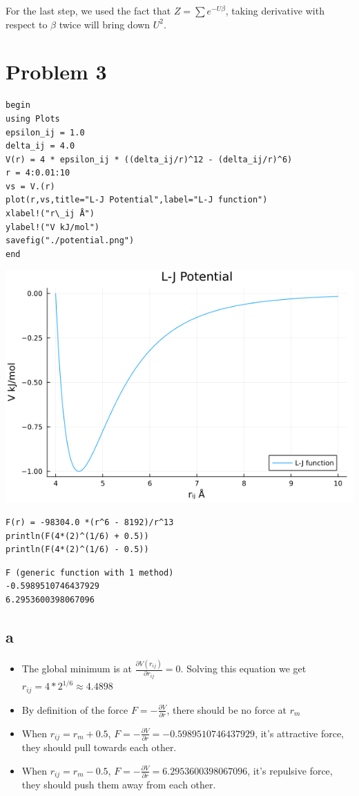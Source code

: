 \documentclass[11pt]{article}
\begin{document}
For the last step, we used the fact that \(Z = \sum e^{-U\beta}\), taking
derivative with respect to \(\beta\) twice will bring down \(U^{2}\).

\section{Problem 3}
\label{sec:orgfe8ea6b}
\begin{verbatim}
begin
using Plots
epsilon_ij = 1.0
delta_ij = 4.0
V(r) = 4 * epsilon_ij * ((delta_ij/r)^12 - (delta_ij/r)^6)
r = 4:0.01:10
vs = V.(r)
plot(r,vs,title="L-J Potential",label="L-J function")
xlabel!("r\_ij Å")
ylabel!("V kJ/mol")
savefig("./potential.png")
end
\end{verbatim}

\begin{center}
\includegraphics[width=.9\linewidth]{./potential.png}
\end{center}

\begin{verbatim}
F(r) = -98304.0 *(r^6 - 8192)/r^13
println(F(4*(2)^(1/6) + 0.5))
println(F(4*(2)^(1/6) - 0.5))
\end{verbatim}

\begin{verbatim}
F (generic function with 1 method)
-0.5989510746437929
6.2953600398067096
\end{verbatim}

\subsection{a}
\label{sec:org1de90d6}
\begin{itemize}
\item The global minimum is at \(\frac{\partial V(r_{ij})}{\partial r_{ij}} = 0\).
Solving this equation we get \(r_{ij} = 4*2^{1/6} \approx 4.4898\)
\item By definition of the force \(F = - \frac{\partial V}{\partial r}\), there
should be no force at \(r_{m}\)
\item When \(r_{ij} = r_{m} + 0.5\), \(F = - \frac{\partial V}{\partial r} =
  -0.5989510746437929\), it's attractive force, they should pull towards each
other.
\item When \(r_{ij} = r_{m} - 0.5\), \(F = - \frac{\partial V}{\partial r} =
  6.2953600398067096\), it's repulsive force, they should push them away from
each other.
\end{itemize}
\end{document}
